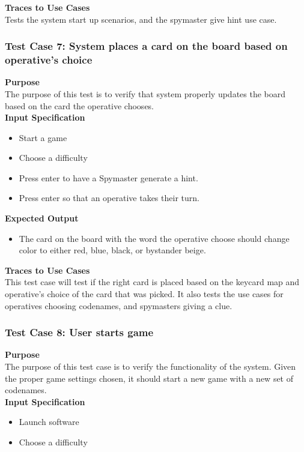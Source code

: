 \documentclass[12pt]{article}
\begin{document}
\noindent
{\bf Traces to Use Cases}\\
Tests the system start up scenarios, and the spymaster give hint use case.

\subsubsection{Test Case 7: System places a card on the board based on operative's choice} \label{tc:2}

\noindent
{\bf Purpose}\\
The purpose of this test is to verify that system properly updates the board based on the card the operative chooses. \\

\noindent
{\bf Input Specification}
\begin{itemize}
    \item Start a game
    \item Choose a difficulty
    \item Press enter to have a Spymaster generate a hint.
    \item Press enter so that an operative takes their turn.
\end{itemize}

\noindent
{\bf Expected Output}
\begin{itemize}
    \item The card on the board with the word the operative choose should change color to either red, blue, black, or bystander beige.
\end{itemize}

\noindent
{\bf Traces to Use Cases}\\
This test case will test if the right card is placed based on the keycard map and operative's choice of the card that was picked. It also tests the use cases for operatives choosing codenames, and spymasters giving a clue.


\subsubsection{Test Case 8: User starts game} \label{tc:2}

\noindent
{\bf Purpose}\\
The purpose of this test case is to verify the functionality of the system. Given the proper game settings chosen, it should start a new game with a new set of codenames. \\

\noindent
{\bf Input Specification}
\begin{itemize}
    \item Launch software
    \item Choose a difficulty
\end{itemize}
\end{document}

